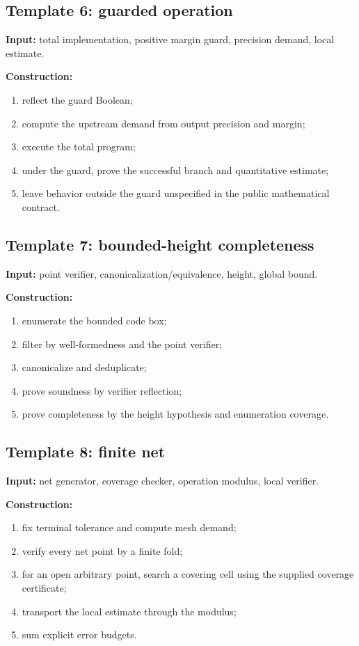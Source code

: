 \subsection{Template 6: guarded operation}

\textbf{Input:} total implementation, positive margin guard, precision demand, local estimate.

\textbf{Construction:}
\begin{enumerate}[label=(\arabic*)]
  \item reflect the guard Boolean;
  \item compute the upstream demand from output precision and margin;
  \item execute the total program;
  \item under the guard, prove the successful branch and quantitative estimate;
  \item leave behavior outside the guard unspecified in the public mathematical contract.
\end{enumerate}

\subsection{Template 7: bounded-height completeness}

\textbf{Input:} point verifier, canonicalization/equivalence, height, global bound.

\textbf{Construction:}
\begin{enumerate}[label=(\arabic*)]
  \item enumerate the bounded code box;
  \item filter by well-formedness and the point verifier;
  \item canonicalize and deduplicate;
  \item prove soundness by verifier reflection;
  \item prove completeness by the height hypothesis and enumeration coverage.
\end{enumerate}

\subsection{Template 8: finite net}

\textbf{Input:} net generator, coverage checker, operation modulus, local verifier.

\textbf{Construction:}
\begin{enumerate}[label=(\arabic*)]
  \item fix terminal tolerance and compute mesh demand;
  \item verify every net point by a finite fold;
  \item for an open arbitrary point, search a covering cell using the supplied coverage certificate;
  \item transport the local estimate through the modulus;
  \item sum explicit error budgets.
\end{enumerate}

